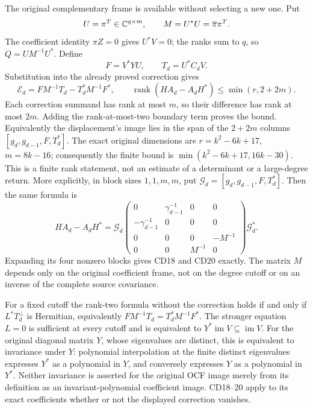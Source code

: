 \documentclass[11pt]{article}
\begin{document}
The original complementary frame is available without selecting a new
one. Put
\[
 U=\pi^T\in\mathbb C^{q\times m},\qquad M=U^*U=\overline\pi\pi^T.
\]
The coefficient identity \(\pi Z=0\) gives \(U^*V=0\); the ranks
sum to \(q\), so \(Q=UM^{-1}U^*\). Define
\[
 F=V^*YU,\qquad T_d=U^*C_dV.
\]
Substitution into the already proved correction gives
\begin{equation}\label{cdroot:eq:actual-complement}
 \boxed{\mathcal E_d=FM^{-1}T_d-T_d^*M^{-1}F^*,
 \qquad
 \operatorname{rank}(HA_d-A_dH^*)\leq\min(r,2+2m).}
 \tag{CD20}
\end{equation}
Each correction summand has rank at most \(m\), so their difference
has rank at most \(2m\). Adding the rank-at-most-two boundary term
proves the bound. Equivalently the displacement's image lies in the
span of the \(2+2m\) columns
\([g_d,g_{d-1},F,T_d^*]\). The exact original dimensions are
\(r=k^2-6k+17\), \(m=8k-16\); consequently the finite bound is
\(\min(k^2-6k+17,16k-30)\). This is a finite rank statement, not an
estimate of a determinant or a large-degree return.
More explicitly, in block sizes \(1,1,m,m\), put
\(\mathcal G_d=[g_d,g_{d-1},F,T_d^*]\). Then the same formula is
\[
 HA_d-A_dH^*=\mathcal G_d
 \begin{pmatrix}
 0&\gamma_{d-1}^{-1}&0&0\\
 -\gamma_{d-1}^{-1}&0&0&0\\
 0&0&0&-M^{-1}\\
 0&0&M^{-1}&0
 \end{pmatrix}\mathcal G_d^*.
\]
Expanding its four nonzero blocks gives CD18 and CD20 exactly. The
matrix \(M\) depends only on the original coefficient frame, not on
the degree cutoff or on an inverse of the complete source covariance.

For a fixed cutoff the rank-two formula without the correction holds
if and only if \(L^*T_d^\perp\) is Hermitian, equivalently
\(FM^{-1}T_d=T_d^*M^{-1}F^*\). The stronger equation \(L=0\) is
sufficient at every cutoff and is equivalent to
\(Y^*\operatorname{im}V\subseteq\operatorname{im}V\).
For the original diagonal matrix \(Y\), whose eigenvalues are distinct,
this is equivalent to invariance under \(Y\): polynomial interpolation
at the finite distinct eigenvalues expresses \(Y^*\) as a polynomial
in \(Y\), and conversely expresses \(Y\) as a polynomial in \(Y^*\).
Neither invariance is asserted for the original OCF image merely from
its definition as an invariant-polynomial coefficient image. CD18--20
apply to its exact coefficients whether or not the displayed correction
vanishes.
\end{document}
